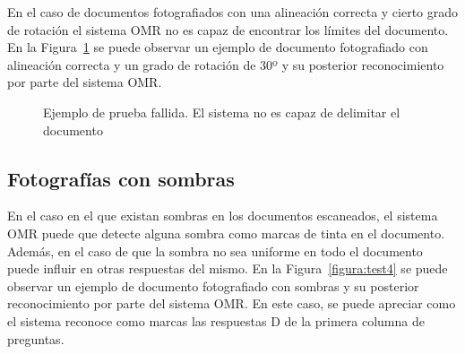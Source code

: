 \documentclass[a4paper, 12pt]{book}
\begin{document}
En el caso de documentos fotografiados con una alineación correcta y cierto
grado de rotación el sistema OMR no es capaz de encontrar los límites del
documento. En la Figura~\ref{figura:test7} se puede observar un ejemplo
de documento fotografiado con alineación correcta y un
grado de rotación de 30º y su posterior
reconocimiento por parte
del sistema OMR.

\begin{figure}
  \centering
  \caption{Ejemplo de prueba fallida. El sistema no es capaz de delimitar el documento}
  \label{figura:test7}
\end{figure}

\subsection{Fotografías con sombras}
\label{subsec:fotografias_sombras}

En el caso en el que existan sombras en los documentos escaneados, el
sistema OMR puede que detecte alguna sombra como marcas de tinta en el
documento. Además, en el caso de que la sombra no sea uniforme en todo el
documento puede influir en otras respuestas del mismo.
En la Figura~\ref{figura:test4} se puede observar un ejemplo
de documento fotografiado con sombras y su posterior
reconocimiento por parte
del sistema OMR.
En este caso, se puede apreciar como el sistema reconoce como marcas
las respuestas D de la primera columna de preguntas.
\end{document}
